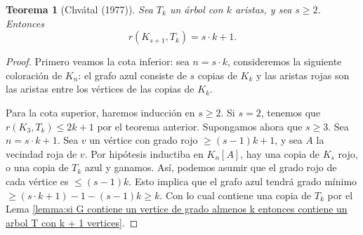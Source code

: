 \documentclass[12pt]{report}
\theoremstyle{plain}
\newtheorem{theorem}{Teorema}[section]
\theoremstyle{definition}
\begin{document}
\begin{theorem}[Chvátal (1977)]
Sea $T_k$ un árbol con $k$ aristas, y sea $s \geq 2$. Entonces
\[
    r(K_{s+1}, T_k) = s \cdot k  + 1.
\]
\end{theorem}
\begin{proof}
Primero veamos la cota inferior: sea $n = s\cdot k$, consideremos la siguiente coloración de $K_n$: el grafo azul consiste de $s$ copias de $K_k$ y las aristas rojas son las aristas entre los vértices de las copias de $K_k$.


Para la cota superior, haremos inducción en $s \geq 2$. Si $s = 2$, tenemos que $r (K_3, T_k) \leq 2 k + 1$ por el teorema anterior. Supongamos ahora que $s \geq 3$. Sea $n = s\cdot k + 1$. Sea $v$ un vértice con grado rojo $\geq (s-1)k + 1$, y sea $A$ la vecindad roja de $v$. Por hipótesis inductiba en $K_n[A]$, hay una copia de $K_s$ rojo, o una copia de $T_k$ azul y ganamos. Así, podemos asumir que el grado rojo de cada vértice es $\leq (s-1)k$. Esto implica que el grafo azul tendrá grado mínimo $\geq (s \cdot k +1 ) - 1 - (s - 1) k \geq k$. Con lo cual contiene una copia de $T_k$ por el Lema \ref{lemma:si G contiene un vertice de grado almenos k entonces contiene un arbol T con k + 1 vertices}.
\end{proof}
\end{document}
